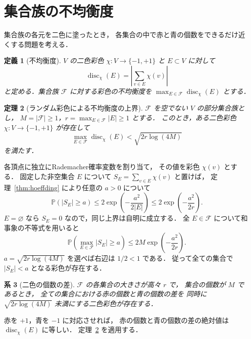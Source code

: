 \documentclass[a5paper,10pt,onecolumn]{jsarticle}
\makeatletter
\theoremstyle{mathnotetheorem}
\newtheorem{theorem}{定理}[section]
\newtheorem{definition}[theorem]{定義}
\newtheorem{corollary}[theorem]{系}
\renewcommand{\proofname}{証明}
\renewenvironment{proof}[1][\proofname]{%
  \par\pushQED{\qed}\normalfont\topsep4\p@\@plus2\p@\relax
  \trivlist\item[\hskip\labelsep\bfseries #1]\ignorespaces
}{\popQED\endtrivlist\@endpefalse}
\makeatother
\begin{document}
\section{集合族の不均衡度}
集合族の各元を二色に塗ったとき，
各集合の中で赤と青の個数をできるだけ近くする問題を考える．

\begin{definition}[不均衡度]
$V$ の二色彩色 $\chi:V\to\{-1,+1\}$ と
$E\subset V$ に対して
\[
 \operatorname{disc}_\chi(E)
 =\left|\sum_{v\in E}\chi(v)\right|
\]
と定める．集合族 $\mathcal F$ に対する彩色の不均衡度を
$\max_{E\in\mathcal F}\operatorname{disc}_\chi(E)$ とする．
\end{definition}

\begin{theorem}[ランダム彩色による不均衡度の上界]\label{thm:discrepancy}
$\mathcal F$ を空でない $V$ の部分集合族とし，
$M=|\mathcal F|\ge1$，$r=\max_{E\in\mathcal F}|E|\ge1$ とする．
このとき，ある二色彩色 $\chi:V\to\{-1,+1\}$ が存在して
\begin{equation}\label{eq:discrepancy}
 \max_{E\in\mathcal F}\operatorname{disc}_\chi(E)
 <\sqrt{2r\log(4M)}
\end{equation}
を満たす．
\end{theorem}
\begin{proof}
各頂点に独立にRademacher確率変数を割り当て，
その値を彩色 $\chi(v)$ とする．
固定した非空集合 $E$ について
$S_E=\sum_{v\in E}\chi(v)$ と置けば，
定理~\ref{thm:hoeffding} により任意の $a>0$ について
\[
 \mathbb P(|S_E|\ge a)
 \le2\exp\left(-\frac{a^2}{2|E|}\right)
 \le2\exp\left(-\frac{a^2}{2r}\right).
\]
$E=\varnothing$ なら $S_E=0$ なので，同じ上界は自明に成立する．
全 $E\in\mathcal F$ について和事象の不等式を用いると
\[
 \mathbb P\left(\max_{E\in\mathcal F}|S_E|\ge a\right)
 \le2M\exp\left(-\frac{a^2}{2r}\right).
\]
$a=\sqrt{2r\log(4M)}$ を選べば右辺は $1/2<1$ である．
従って全ての集合で $|S_E|<a$ となる彩色が存在する．
\end{proof}

\begin{corollary}[二色の個数の差]
$\mathcal F$ の各集合の大きさが高々 $r$ で，
集合の個数が $M$ であるとき，
全ての集合における赤の個数と青の個数の差を
同時に $\sqrt{2r\log(4M)}$ 未満にする二色彩色が存在する．
\end{corollary}
\begin{proof}
赤を $+1$，青を $-1$ に対応させれば，
赤の個数と青の個数の差の絶対値は
$\operatorname{disc}_\chi(E)$ に等しい．
定理~\ref{thm:discrepancy} を適用する．
\end{proof}
\end{document}
